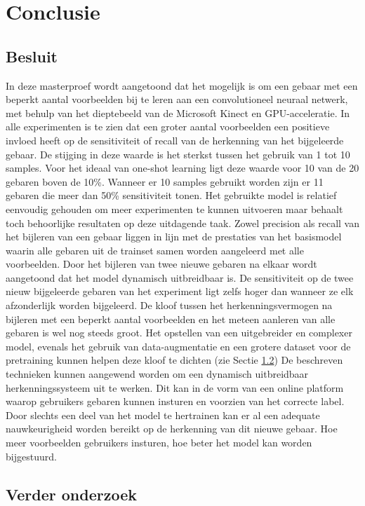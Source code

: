 \chapter{Conclusie}
\section{Besluit}
In deze masterproef wordt aangetoond dat het mogelijk is om een gebaar met een beperkt aantal voorbeelden bij te leren aan een convolutioneel neuraal netwerk, met behulp van het dieptebeeld van de Microsoft Kinect en GPU-acceleratie.
\npar In alle experimenten is te zien dat een groter aantal voorbeelden een positieve invloed heeft op de sensitiviteit of recall van de herkenning van het bijgeleerde gebaar. De stijging in deze waarde is het sterkst tussen het gebruik van 1 tot 10 samples. Voor het ideaal van one-shot learning ligt deze waarde voor 10 van de 20 gebaren boven de 10\%. Wanneer er 10 samples gebruikt worden zijn er 11 gebaren die meer dan 50\% sensitiviteit tonen. Het gebruikte model is relatief eenvoudig gehouden om meer experimenten te kunnen uitvoeren maar behaalt toch behoorlijke resultaten op deze uitdagende taak.
\npar Zowel precision als recall van het bijleren van een gebaar liggen in lijn met de prestaties van het basismodel waarin alle gebaren uit de trainset samen worden aangeleerd met alle voorbeelden. 
\npar Door het bijleren van twee nieuwe gebaren na elkaar wordt aangetoond dat het model dynamisch uitbreidbaar is. De sensitiviteit op de twee nieuw bijgeleerde gebaren van het experiment ligt zelfs hoger dan wanneer ze elk afzonderlijk worden bijgeleerd.
\npar De kloof tussen het herkenningsvermogen na bijleren met een beperkt aantal voorbeelden en het meteen aanleren van alle gebaren is wel nog steeds groot. Het opstellen van een uitgebreider en complexer model, evenals het gebruik van data-augmentatie en een grotere dataset voor de pretraining kunnen helpen deze kloof te dichten (zie Sectie \ref{sec:verder})
\npar De beschreven technieken kunnen aangewend worden om een dynamisch uitbreidbaar herkenningssysteem uit te werken. Dit kan in de vorm van een online platform waarop gebruikers gebaren kunnen insturen en voorzien van het correcte label. Door slechts een deel van het model te hertrainen kan er al een adequate nauwkeurigheid worden bereikt op de herkenning van dit nieuwe gebaar. Hoe meer voorbeelden gebruikers insturen, hoe beter het model kan worden bijgestuurd.

\section{Verder onderzoek}\label{sec:verder}

